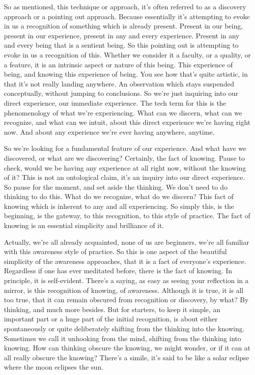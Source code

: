 \documentclass[12pt,openany]{book}
\begin{document}
So as mentioned, this technique or approach, it's often referred to as a discovery approach or a pointing out approach. Because essentially it's attempting to evoke in us a recognition of something which is already present. Present in our being, present in our experience, present in any and every experience. Present in any and every being that is a sentient being. So this pointing out is attempting to evoke in us a recognition of this. Whether we consider it a faculty, or a quality, or a feature, it is an intrinsic aspect or nature of this being. This experience of being, and knowing this experience of being. You see how that's quite artistic, in that it’s not really landing anywhere. An observation which stays suspended conceptually, without jumping to conclusions. So we're just inquiring into our direct experience, our immediate experience. The tech term for this is the phenomenology of what we’re experiencing. What can we discern, what can we recognize, and what can we intuit, about this direct experience we're having right now. And about any experience we’re ever having anywhere, anytime.

So we're looking for a fundamental feature of our experience. And what have we discovered, or what are we discovering? Certainly, the fact of knowing. Pause to check, would we be having any experience at all right now, without the knowing of it? This is not an ontological claim, it's an inquiry into our direct experience. So pause for the moment, and set aside the thinking. We don’t need to do thinking to do this. What do we recognize, what do we discern? This fact of knowing which is inherent to any and all experiencing. So simply this, is the beginning, is the gateway, to this recognition, to this style of practice. The fact of knowing is an essential simplicity and brilliance of it.

Actually,  we're all already acquainted, none of us are beginners, we're all familiar with this awareness style of practice. So this is one aspect of the beautiful simplicity of the awareness approaches, that it is a fact of everyone's experience. Regardless if one has ever meditated before, there is the fact of knowing. In principle, it is self-evident. There's a saying, as easy as seeing your reflection in a mirror, is this recognition of knowing, of awareness. Although it is true, it is all too true, that it can remain obscured from recognition or discovery, by what? By thinking, and much more besides. But for starters, to keep it simple, an important part or a huge part of the initial recognition, is about either spontaneously or quite deliberately shifting from the thinking into the knowing. Sometimes we call it unhooking from the mind, shifting from the thinking into knowing. How can thinking obscure the knowing, we might wonder, or if it can at all really obscure the knowing? There's a simile, it's said to be like a solar eclipse where the moon eclipses the sun.
\end{document}
